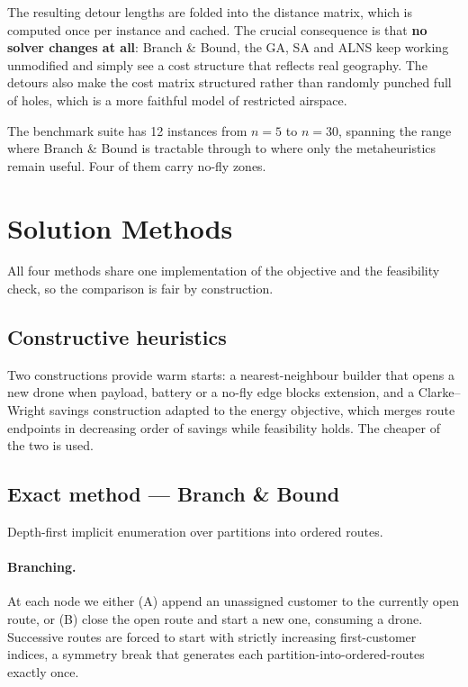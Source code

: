 \documentclass[11pt,a4paper]{article}
\begin{document}
The resulting detour lengths are folded into the distance matrix, which is
computed once per instance and cached. The crucial consequence is that
\textbf{no solver changes at all}: Branch \& Bound, the GA, SA and ALNS keep
working unmodified and simply see a cost structure that reflects real geography.
The detours also make the cost matrix structured rather than randomly punched
full of holes, which is a more faithful model of restricted airspace.

The benchmark suite has 12 instances from $n=5$ to $n=30$, spanning the range
where Branch \& Bound is tractable through to where only the metaheuristics
remain useful. Four of them carry no-fly zones.

\section{Solution Methods}

All four methods share one implementation of the objective and the feasibility
check, so the comparison is fair by construction.

\subsection{Constructive heuristics}

Two constructions provide warm starts: a nearest-neighbour builder that opens a
new drone when payload, battery or a no-fly edge blocks extension, and a
Clarke--Wright savings construction adapted to the energy objective, which merges
route endpoints in decreasing order of savings while feasibility holds. The
cheaper of the two is used.

\subsection{Exact method --- Branch \& Bound}

Depth-first implicit enumeration over partitions into ordered routes.

\paragraph{Branching.} At each node we either (A) append an unassigned customer
to the currently open route, or (B) close the open route and start a new one,
consuming a drone. Successive routes are forced to start with strictly increasing
first-customer indices, a symmetry break that generates each
partition-into-ordered-routes exactly once.
\end{document}
